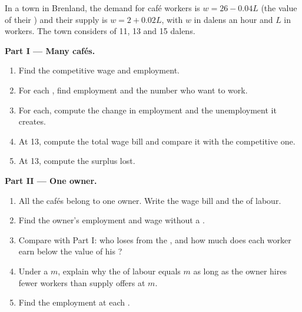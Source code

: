 \begin{problem}
\label{pb:g11:labour-market:1}
In a town in Brenland, the demand for café workers is $w = 26 - 0.04L$ (the value of their ) and their supply is $w = 2 + 0.02L$, with $w$ in dalens an
hour and $L$ in workers. The town considers  of 11, 13 and 15 dalens.

\medskip
\noindent\textbf{Part I --- Many cafés.}
\begin{enumerate}
\item Find the competitive wage and employment.
\item For each , find employment and the number who want to work.
\item For each, compute the change in employment and the unemployment it creates.
\item At 13, compute the total wage bill and compare it with the competitive one.
\item At 13, compute the surplus lost.
\end{enumerate}

\medskip
\noindent\textbf{Part II --- One owner.}
\begin{enumerate}[resume]
\item All the cafés belong to one owner. Write the wage bill and the  of labour.
\item Find the owner's employment and wage without a .
\item Compare with Part I: who loses from the , and how much does each worker earn below the value of his ?
\item Under a  $m$, explain why the  of labour equals $m$ as long as the owner hires fewer workers than supply offers at $m$.
\item Find the employment at each .
\end{enumerate}


\end{problem}
